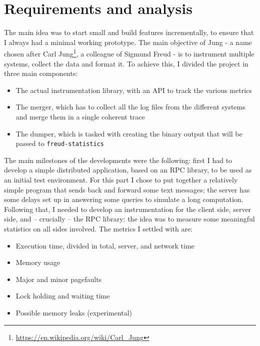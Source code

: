     \section{Requirements and analysis}\label{sec:requirements}


        The main idea was to start small and build features incrementally, to ensure that I always
        had a minimal working prototype. The main objective of Jung - a name chosen after Carl
        Jung\footnote{\url{https://en.wikipedia.org/wiki/Carl_Jung}},
        a colleague of Sigmund Freud - is to instrument multiple systems, collect the data and format it.
        To achieve this, I divided the project in three main components:

        \begin{itemize}
            \item The actual instrumentation library, with an API to track the various metrics
            \item The merger, which has to collect all the log files from the different systems
             and merge them in a single coherent trace
            \item The dumper, which is tasked with creating the binary output that will be passed
             to \texttt{freud-statistics}
        \end{itemize}

        The main milestones of the developments were the following: first I had to develop a
        simple distributed application, based on an RPC library, to be used as an initial test environment.
        For this part I chose to put together a relatively simple program that sends back and forward
        some text messages; the server has some delays set up in answering some queries to simulate a
        long computation.\\

        Following that, I needed to develop an instrumentation for the client side, server side,
        and – crucially – the RPC library:
        the idea was to measure some meaningful statistics on all sides involved. 
        The metrics I settled with are:

        \begin{itemize}
            \item Execution time, divided in total, server, and network time
            \item Memory usage
            \item Major and minor pagefaults
            \item Lock holding and waiting time
            \item Possible memory leaks (experimental)
        \end{itemize}

